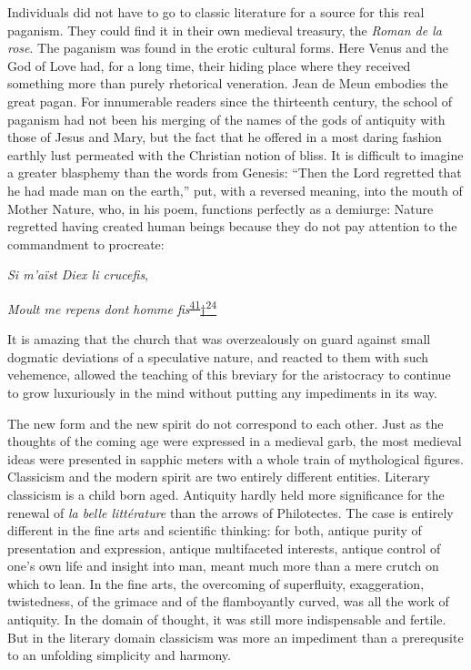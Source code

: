 Individuals did not have to go to classic literature for a source for
this real paganism. They could find it in their own medieval treasury,
the \emph{Roman de la rose}. The paganism was found in the erotic
cultural forms. Here Venus and the God of Love had, for a long time,
their hiding place where they received something more than purely
rhetorical veneration. Jean de Meun embodies the great pagan. For
innumerable readers since the thirteenth century, the school of paganism
had not been his merging of the names of the gods of antiquity with
those of Jesus and Mary, but the fact that he offered in a most daring
fashion earthly lust permeated with the Christian notion of bliss. It is
difficult to imagine a greater blasphemy than the words from Genesis:
``Then the Lord regretted that he had made man on the earth,'' put, with
a reversed meaning, into the mouth of Mother Nature, who, in his poem,
functions perfectly as a demiurge: Nature regretted having created human
beings because they do not pay attention to the commandment to
procreate:

\emph{Si m'aïst Diex li crucefis},

\emph{Moult me repens dont homme
fis}\textsuperscript{\protect\hypertarget{22_Chapter_Fourteen__THE_COMING_OF.xhtmlux5cux23id_43}{\protect\hyperlink{23_NOTES.xhtmlux5cux23id_44}{41}}}\protect\hypertarget{22_Chapter_Fourteen__THE_COMING_OF.xhtmlux5cux23id_2765}{\protect\hyperlink{23_NOTES.xhtmlux5cux23id_2766}{†\textsuperscript{24}}}

It is amazing that the church that was overzealously on guard against
small dogmatic deviations of a speculative nature, and reacted to them
with such vehemence, allowed the teaching of this breviary for the
aristocracy to continue to grow luxuriously in the mind without putting
any impediments in its way.

The new form and the new spirit do not correspond to each other. Just as
the thoughts of the coming age were expressed in a medieval garb, the
most medieval ideas were presented in sapphic meters with a whole train
of mythological figures. Classicism and the modern spirit are two
entirely different entities. Literary classicism is a child born aged.
Antiquity hardly held more significance for the renewal of \emph{la
belle littérature} than the arrows of Philotectes. The case is entirely
different in the fine arts and scientific thinking:
\protect\hypertarget{22_Chapter_Fourteen__THE_COMING_OF.xhtmlux5cux23page_396}{}{}for
both, antique purity of presentation and expression, antique
multifaceted interests, antique control of one's own life and insight
into man, meant much more than a mere crutch on which to lean. In the
fine arts, the overcoming of superfluity, exaggeration, twistedness, of
the grimace and of the flamboyantly curved, was all the work of
antiquity. In the domain of thought, it was still more indispensable and
fertile. But in the literary domain classicism was more an impediment
than a prerequsite to an unfolding simplicity and harmony.

